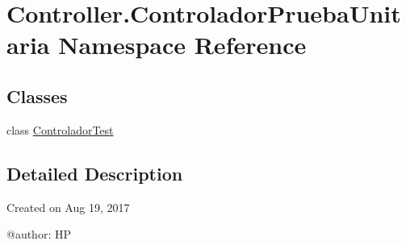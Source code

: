 \hypertarget{namespace_controller_1_1_controlador_prueba_unitaria}{}\section{Controller.\+Controlador\+Prueba\+Unitaria Namespace Reference}
\label{namespace_controller_1_1_controlador_prueba_unitaria}
\subsection*{Classes}
\begin{DoxyCompactItemize}
\item 
class \hyperlink{class_controller_1_1_controlador_prueba_unitaria_1_1_controlador_test}{Controlador\+Test}
\end{DoxyCompactItemize}


\subsection{Detailed Description}
\begin{DoxyVerb}Created on Aug 19, 2017

@author: HP
\end{DoxyVerb}
 